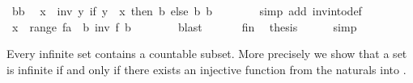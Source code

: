 \begin{isabellebody}
\ b{}b{}\ \isamarkupfalse%
\ {\isachardoublequoteopen}x\ {\isacharequal}{\kern0pt}\ inv\ {\isacharparenleft}{\kern0pt}{\isasymlambda}y{\isachardot}{\kern0pt}\ if\ y\ {\isacharequal}{\kern0pt}\ x\ then\ b{}\ else\ b{}{\isacharparenright}{\kern0pt}\ b{}{\isachardoublequoteclose}\isanewline
\ \ \ \ \ \ \isamarkupfalse%
\ {\isacharparenleft}{\kern0pt}simp\ add{\isacharcolon}{\kern0pt}\ inv{\isacharunderscore}{\kern0pt}into{\isacharunderscore}{\kern0pt}def{\isacharparenright}{\kern0pt}\isanewline
\ \ \ \ \isamarkupfalse%
\ \isamarkupfalse%
\ {\isachardoublequoteopen}x\ {\isasymin}\ range\ {\isacharparenleft}{\kern0pt}{\isasymlambda}f{\isacharcolon}{\kern0pt}{\isacharcolon}{\kern0pt}{\isacharprime}{\kern0pt}a\ {\isasymRightarrow}\ {\isacharprime}{\kern0pt}b{\isachardot}{\kern0pt}\ inv\ f\ b{}{\isacharparenright}{\kern0pt}{\isachardoublequoteclose}\isanewline
\ \ \ \ \ \ \isamarkupfalse%
\ blast\isanewline
\ \ \isamarkupfalse%
\isanewline
\ \ \isamarkupfalse%
\ fin{\isacharprime}{\kern0pt}\ \isamarkupfalse%
\ {\isacharquery}{\kern0pt}thesis\isanewline
\ \ \ \ \isamarkupfalse%
\ simp\isanewline
{}\isamarkupfalse%
%
\endisatagproof
{\isafoldproof}%
%
\isadelimproof
%
\endisadelimproof
%
\begin{isamarkuptext}%
Every infinite set contains a countable subset. More precisely we
  show that a set  is infinite if and only if there exists an
  injective function from the naturals into .


\end{isamarkuptext}
\end{isabellebody}
